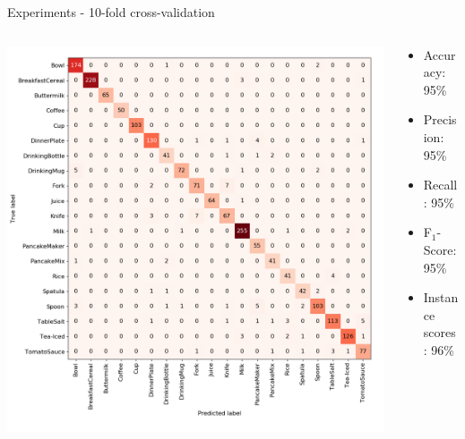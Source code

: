 \documentclass[]{beamer}
\begin{document}
\begin{frame}{Experiments - 10-fold cross-validation}
\begin{columns}
	\begin{column}{0.7\textwidth}
		\includegraphics[scale=.3]{../thesis/img/chapter6/UnrealGTClass.png}
	\end{column}
	\quad
	\begin{column}{0.3\textwidth}
		\begin{itemize}
			\item Accuracy: 95\%
			\item Precision: 95\%
			\item Recall: 95\%
			\item F$_{1}$-Score: 95\%
			\bigskip
			\item Instance scores: 96\%
		\end{itemize}
	\end{column}
\end{columns}
\end{frame}
\end{document}
